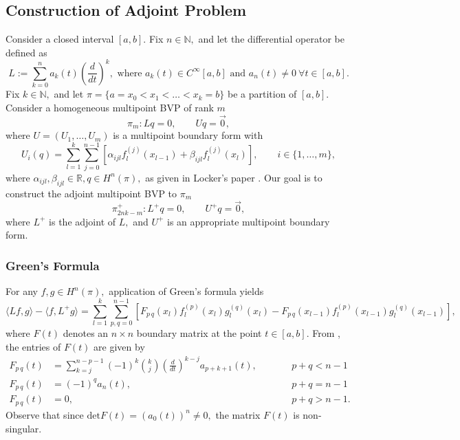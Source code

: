 \documentclass[11pt,reqno,oneside,a4paper]{article}
\theoremstyle{plain} %
\theoremstyle{definition}
\theoremstyle{remark}
\begin{document}
	
\subsection*{Construction of Adjoint Problem}
Consider a closed interval $[a,b].$ Fix $n\in\mathbb{N},$ and let the differential operator be defined as
\[ 
L  := \sum^n_{k=0} a_k(t)\left( \frac{d}{dt}\right)^k, \mbox{ where } a_k(t) \in C^{\infty}[a,b] \mbox{ and } a_n(t) \neq 0~ \forall t \in [a,b].
\]
Fix $k \in \mathbb{N},$ and let $\pi = \{ a = x_0 < x_1 < \ldots < x_k = b\}$ be a partition of $[a,b].$ Consider a homogeneous multipoint BVP of rank $m$
\[ \pi_m: Lq = 0, \qquad Uq = \vec{0},\]
where $U = (U_1, \ldots, U_m)$ is a multipoint boundary form with 
\[ 
U_i(q) = \sum^{k}_{l=1} \sum^{n-1}_{j=0}[\alpha_{ijl} f_l^{(j)}(x_{l-1}) + \beta_{ijl} f_l^{(j)}(x_{l})], \qquad i \in \{ 1, \ldots, m \}, 
\]
where $\alpha_{ijl}, \beta_{ijl} \in \mathbb{R}, q \in H^n(\pi),$ as given in Locker's paper \cite{locker}.
Our goal is to construct the adjoint multipoint BVP to $\pi_m$
\[ 
\pi^+_{2nk-m}: L^+ q = 0, \qquad U^+q = \vec{0},
\] 
where $L^+$ is the adjoint of $L,$ and $U^+$ is an appropriate multipoint boundary form.
\subsubsection*{Green's Formula}
For any $f,g \in H^n(\pi),$ application of Green's formula yields
\[ \langle Lf,g\rangle - \langle f,L^+ g\rangle = \sum_{l=1}^{k}\sum_{p,q=0}^{n-1}[F_{p\,q}(x_l) f_l^{(p)}(x_l)g_l^{(q)}(x_l) - F_{p\,q}(x_{l-1})f_l^{(p)}(x_{l-1})g_l^{(q)}(x_{l-1})], \]
where $F(t)$ denotes an $n\times n$ boundary matrix at the point $t \in [a,b].$ From \cite[p. 1286]{dunford}, the entries of $F(t)$ are given by
\begin{equation*}
\begin{aligned}
F_{p\,q}(t) &= \sum^{n-p-1}_{k = j} (-1)^k \binom{k}{j} \left( \frac{d}{dt}\right)^{k-j} a_{p+k+1}(t), &&\qquad p + q< n - 1\\
F_{p\,q}(t) &= (-1)^q  a_{n}(t), &&\qquad p + q= n - 1\\
F_{p\,q}(t) &= 0, &&\qquad p + q > n - 1.
\end{aligned}
\end{equation*}
Observe that since $\mathrm{det}F(t) = (a_0(t))^n \neq 0,$ the matrix $F(t)$ is non-singular. 
\end{document}

